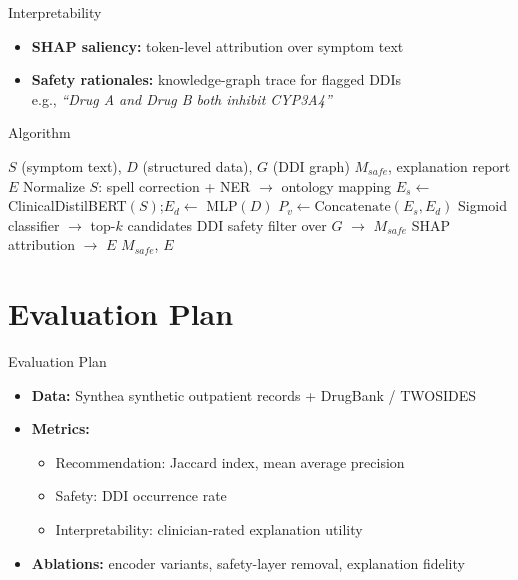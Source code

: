 \begin{frame}{Interpretability}
  \begin{itemize}
    \item \textbf{SHAP saliency:} token-level attribution over symptom text
    \pause
    \item \textbf{Safety rationales:} knowledge-graph trace for flagged DDIs\\
    {\small e.g., \textit{``Drug A and Drug B both inhibit CYP3A4''}}
  \end{itemize}
\end{frame}

\begin{frame}{Algorithm}
  \begin{algorithm}[H]
  \caption{DL Medication Recommendation}
  \begin{algorithmic}[1]
    \REQUIRE $S$ (symptom text), $D$ (structured data), $G$ (DDI graph)
    \ENSURE $M_{safe}$, explanation report $E$
    \STATE Normalize $S$: spell correction + NER $\to$ ontology mapping
    \STATE $E_s \leftarrow$ ClinicalDistilBERT$(S)$;\quad $E_d \leftarrow$ MLP$(D)$
    \STATE $P_v \leftarrow \text{Concatenate}(E_s, E_d)$
    \STATE Sigmoid classifier $\to$ top-$k$ candidates
    \STATE DDI safety filter over $G$ $\to$ $M_{safe}$
    \STATE SHAP attribution $\to$ $E$
    \RETURN $M_{safe}$, $E$
  \end{algorithmic}
  \end{algorithm}
\end{frame}

\section{Evaluation Plan}

\begin{frame}{Evaluation Plan}
  \begin{itemize}
    \item \textbf{Data:} Synthea synthetic outpatient records + DrugBank / TWOSIDES
    \pause
    \item \textbf{Metrics:}
    \begin{itemize}
      \item Recommendation: Jaccard index, mean average precision
      \item Safety: DDI occurrence rate
      \item Interpretability: clinician-rated explanation utility
    \end{itemize}
    \pause
    \item \textbf{Ablations:} encoder variants, safety-layer removal, explanation fidelity
  \end{itemize}
\end{frame}

